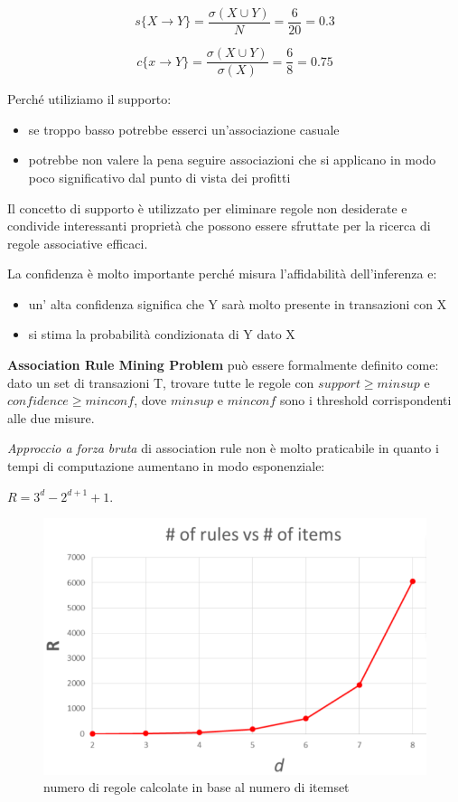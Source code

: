 \[s\{X \rightarrow Y\} = \frac{\sigma(X \cup Y)}{N} = \frac{6}{20} = 0.3\]

\[c\{x \rightarrow Y\} = \frac{\sigma(X \cup Y)}{\sigma(X)} = \frac{6}{8} = 0.75\]

Perché utiliziamo il supporto:
\begin{itemize}
	\item se troppo basso potrebbe esserci un'associazione casuale
	\item potrebbe non valere la pena seguire associazioni che si applicano in modo poco significativo dal punto di vista dei profitti 
\end{itemize}
Il concetto di supporto è utilizzato per eliminare regole non desiderate e condivide interessanti proprietà che possono essere sfruttate per la ricerca di regole associative efficaci.

La confidenza \`e molto importante perché misura l'affidabilità dell'inferenza e:
\begin{itemize}
	\item un' alta confidenza significa che Y sarà molto presente in transazioni con X 
	\item si stima la probabilit\`a condizionata di Y dato X
\end{itemize}
\begin{defn}
\textbf{Association Rule Mining Problem} può essere formalmente definito come: dato un set di transazioni T, trovare tutte le regole con $support \ge minsup$ e $confidence \ge minconf$, dove $minsup$ e $minconf$ sono i threshold corrispondenti alle due misure.
\end{defn}

\textit{Approccio a forza bruta} di association rule non è molto praticabile in quanto i tempi di computazione aumentano in modo esponenziale: 

$R = 3^d - 2^{d+1} + 1$.

\begin{figure}[H]
	\centering
	\includegraphics[height=0.4 \linewidth]{association/pict/brute_force.png}
	\caption{numero di regole calcolate in base al numero di itemset}
\end{figure}

